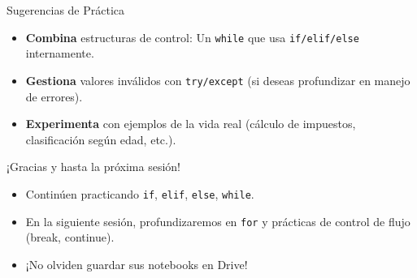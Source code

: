 \documentclass[10pt]{beamer}
\begin{document}
\begin{frame}{Sugerencias de Práctica}
  \begin{itemize}
    \item \textbf{Combina} estructuras de control: Un \texttt{while} que usa \texttt{if/elif/else} internamente.
    \item \textbf{Gestiona} valores inválidos con \texttt{try/except} (si deseas profundizar en manejo de errores).
    \item \textbf{Experimenta} con ejemplos de la vida real (cálculo de impuestos, clasificación según edad, etc.).
  \end{itemize}
\end{frame}

\begin{frame}
  \huge{\centerline{¡Gracias y hasta la próxima sesión!}}
  \vspace{0.3cm}
  \normalsize
  \begin{itemize}
    \item Continúen practicando \texttt{if}, \texttt{elif}, \texttt{else}, \texttt{while}.
    \item En la siguiente sesión, profundizaremos en \texttt{for} y prácticas de control de flujo (break, continue).
    \item ¡No olviden guardar sus notebooks en Drive!
  \end{itemize}
\end{frame}
\end{document}
